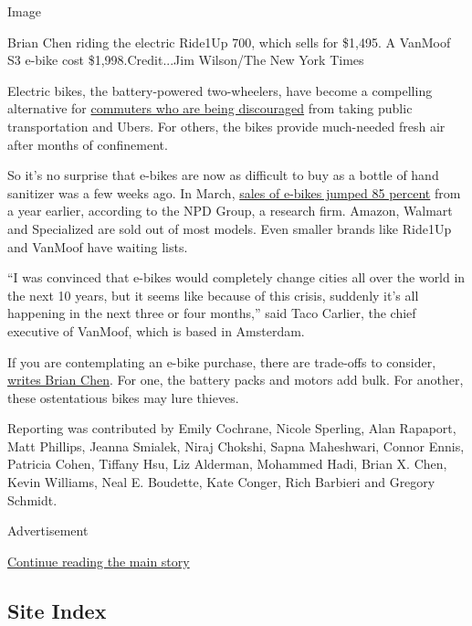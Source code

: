 Image

Brian Chen riding the electric Ride1Up 700, which sells for \$1,495. A
VanMoof S3 e-bike cost \$1,998.Credit...Jim Wilson/The New York Times

Electric bikes, the battery-powered two-wheelers, have become a
compelling alternative for
\href{https://www.nytimes3xbfgragh.onion/2020/05/28/health/cdc-coronavirus-offices.html?action=click\&module=Top\%20Stories\&pgtype=Homepage}{commuters
who are being discouraged} from taking public transportation and Ubers.
For others, the bikes provide much-needed fresh air after months of
confinement.

So it's no surprise that e-bikes are now as difficult to buy as a bottle
of hand sanitizer was a few weeks ago. In March,
\href{https://www.nytimes3xbfgragh.onion/2020/05/18/nyregion/bike-shortage-coronavirus.html}{sales
of e-bikes jumped 85 percent} from a year earlier, according to the NPD
Group, a research firm. Amazon, Walmart and Specialized are sold out of
most models. Even smaller brands like Ride1Up and VanMoof have waiting
lists.

``I was convinced that e-bikes would completely change cities all over
the world in the next 10 years, but it seems like because of this
crisis, suddenly it's all happening in the next three or four months,''
said Taco Carlier, the chief executive of VanMoof, which is based in
Amsterdam.

If you are contemplating an e-bike purchase, there are trade-offs to
consider,
\href{https://www.nytimes3xbfgragh.onion/2020/06/03/technology/personaltech/e-bikes-are-having-their-moment-they-deserve-it.html}{writes
Brian Chen}. For one, the battery packs and motors add bulk. For
another, these ostentatious bikes may lure thieves.

Reporting was contributed by Emily Cochrane, Nicole Sperling, Alan
Rapaport, Matt Phillips, Jeanna Smialek, Niraj Chokshi, Sapna
Maheshwari, Connor Ennis, Patricia Cohen, Tiffany Hsu, Liz Alderman,
Mohammed Hadi, Brian X. Chen, Kevin Williams, Neal E. Boudette, Kate
Conger, Rich Barbieri and Gregory Schmidt.

Advertisement

\protect\hyperlink{after-bottom}{Continue reading the main story}

\hypertarget{site-index}{%
\subsection{Site Index}\label{site-index}}

